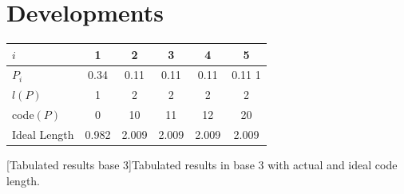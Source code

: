 \lipsum[1-2]
\section{Developments}
\lipsum[1-1]
\smallskip

\renewcommand{\baselinestretch}{1.4}
\setlength{\tabcolsep}{5pt}
\begin{Table}
\centering
\begin{tabular}[scale=0.55]{ | l | c | c | c | c |c |}
\hline
\hline
$i$ & 1 & 2 & 3 & 4 & 5 \\
\hline
$P_i$ & 0.34 & 0.11 & 0.11 & 0.11 & 0.11 1\\
\hline
$l(P)$ & 1 & 2 & 2 & 2 & 2 \\
\hline
code$(P)$ & 0 & 10 & 11 & 12 & 20  \\
\hline
Ideal Length & 0.982    & 2.009    & 2.009 & 2.009 & 2.009  \\
\hline
\end{tabular}
[Tabulated results base 3]{Tabulated results in base 3 with actual and ideal code length.}
\end{Table}
\renewcommand{\baselinestretch}{1.0}


\lipsum[1-2]

